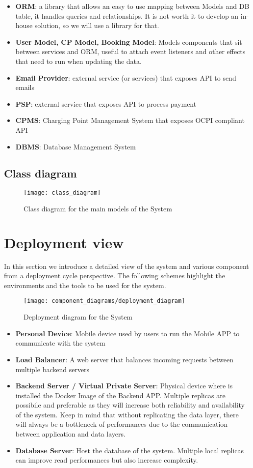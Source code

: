 \begin{itemize}
	\item \textbf{ORM}: a library that allows an easy to use mapping between Models and DB table, it handles queries and relationships. It is not worth it to develop an in-house solution, so we will use a library for that.
	\item \textbf{User Model, CP Model, Booking Model}: Models components that sit between services and ORM, useful to attach event listeners and other effects that need to run when updating the data. 
	\item \textbf{Email Provider}: external service (or services) that exposes API to send emails
	\item \textbf{PSP}: external service that exposes API to process payment
	\item \textbf{CPMS}: Charging Point Management System that exposes OCPI compliant API
	\item \textbf{DBMS}: Database Management System
\end{itemize}

\clearpage
\subsection{Class diagram}
\begin{figure}[h]
\texttt{[image: class\_diagram]}
\caption{Class diagram for the main models of the System}
\end{figure}
\clearpage
\newpage

\section{Deployment view}
In this section we introduce a detailed view of the system and various component from a deployment cycle perspective. The following schemes highlight the environments and the tools to be used for the system.
\begin{figure}[h]
\texttt{[image: component\_diagrams/deployment\_diagram]}
\caption{Deployment diagram for the System}
\end{figure}

\begin{itemize}
	\item \textbf{Personal Device}: Mobile device used by users to run the Mobile APP to communicate with the system
	\item \textbf{Load Balancer}: A web server that balances incoming requests between multiple backend servers
	\item \textbf{Backend Server / Virtual Private Server}: Physical device where is installed the Docker Image of the Backend APP. Multiple replicas are possibile and preferable as they will increase both reliability and availability of the system. Keep in mind that without replicating the data layer, there will always be a bottleneck of performances due to the communication between application and data layers.
	\item \textbf{Database Server}: Host the database of the system. Multiple local replicas can improve read performances but also increase complexity.
\end{itemize}


